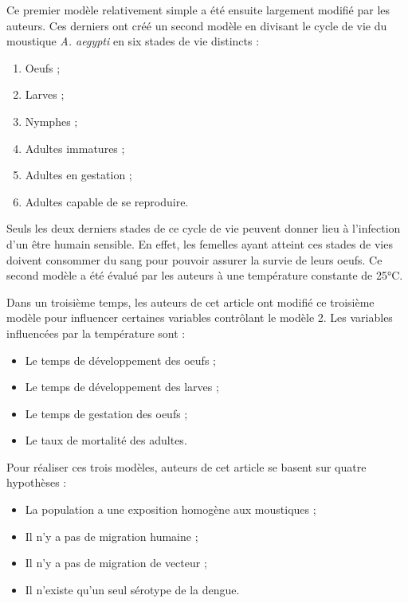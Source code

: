 \documentclass[
  12pt,
  french,
  oneside]{article}
\providecommand{\tightlist}{%
  \setlength{\itemsep}{0pt}\setlength{\parskip}{0pt}}
\begin{document}
Ce premier modèle relativement simple a été ensuite largement modifié
par les auteurs. Ces derniers ont créé un second modèle en divisant le
cycle de vie du moustique \emph{A. aegypti} en six stades de vie
distincts :

\begin{enumerate}
\def\labelenumi{\arabic{enumi}.}
\tightlist
\item
  Oeufs ;
\item
  Larves ;
\item
  Nymphes ;
\item
  Adultes immatures ;
\item
  Adultes en gestation ;
\item
  Adultes capable de se reproduire.
\end{enumerate}

Seuls les deux derniers stades de ce cycle de vie peuvent donner lieu à
l'infection d'un être humain sensible. En effet, les femelles ayant
atteint ces stades de vies doivent consommer du sang pour pouvoir
assurer la survie de leurs oeufs. Ce second modèle a été évalué par les
auteurs à une température constante de 25°C.

Dans un troisième temps, les auteurs de cet article ont modifié ce
troisième modèle pour influencer certaines variables contrôlant le
modèle 2. Les variables influencées par la température sont :

\begin{itemize}
\tightlist
\item
  Le temps de développement des oeufs ;
\item
  Le temps de développement des larves ;
\item
  Le temps de gestation des oeufs ;
\item
  Le taux de mortalité des adultes.
\end{itemize}

Pour réaliser ces trois modèles, auteurs de cet article se basent sur
quatre hypothèses :

\begin{itemize}
\tightlist
\item
  La population a une exposition homogène aux moustiques ;
\item
  Il n'y a pas de migration humaine ;
\item
  Il n'y a pas de migration de vecteur ;
\item
  Il n'existe qu'un seul sérotype de la dengue.
\end{itemize}
\end{document}
